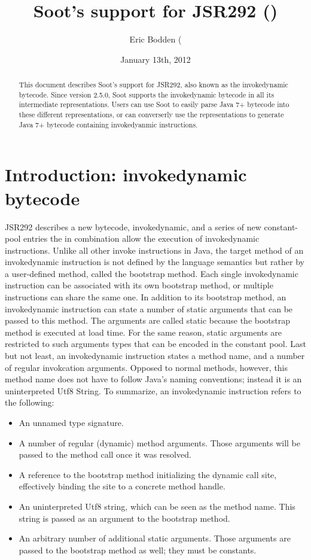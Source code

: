 \documentclass{article}
\title{Soot's support for JSR292 (\id)}
\author{Eric Bodden
(\htmladdnormallink{eric.bodden@ec-spride.de)}{mailto:eric.bodden@ec-spride.de}}
\date{January 13th, 2012}
\newcommand{\id}{invokedynamic\xspace}
\begin{document}
\maketitle

\begin{abstract}
This document describes Soot's support for JSR292, also known as the
\id bytecode. Since version 2.5.0, Soot supports the \id
bytecode in all its intermediate representations. Users can use Soot to easily
parse Java 7+ bytecode into these different representations, or can
converserly use the representations to generate Java 7+ bytecode containing
invokedyanmic instructions.
\end{abstract}

\section{Introduction: invokedynamic bytecode}

JSR292 describes a new bytecode, \id, and a series of new
constant-pool entries the in combination allow the execution of \id
instructions. Unlike all other invoke instructions in Java, the target method of
an \id instruction is not defined by the language semantics but
rather by a user-defined method, called the bootstrap method. Each single \id
instruction can be associated with its own bootstrap method, or multiple
instructions can share the same one. In addition to its bootstrap method, an \id
instruction can state a number of static arguments that can be passed to this
method. The arguments are called static because the bootstrap method is executed
at load time. For the same reason, static arguments are restricted to such
arguments types that can be encoded in the constant pool. Last but not least, an
\id instruction states a method name, and a number of regular
invokcation arguments. Opposed to normal methods, however, this method name does
not have to follow Java's naming conventions; instead it is an uninterpreted
Utf8 String. To summarize, an \id instruction refers to the following:
\begin{itemize}
  \item An unnamed type signature.
  \item A number of regular (dynamic) method arguments. Those arguments will be
  passed to the method call once it was resolved.
  \item A reference to the bootstrap method initializing the dynamic call site,
  effectively binding the site to a concrete method handle.
  \item An uninterpreted Utf8 string, which can be seen as the method name. This
  string is passed as an argument to the bootstrap method. 
  \item An arbitrary number of additional static arguments. Those arguments are
  passed to the bootstrap method as well; they must be constants.
\end{itemize} 
\end{document}
